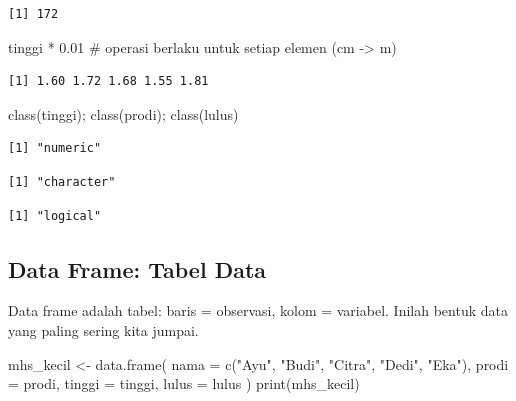 \documentclass[
  indonesian,
  letterpaper,
]{book}
\newenvironment{Shaded}{\begin{snugshade}}{\end{snugshade}}
\newcommand{\AttributeTok}[1]{\textcolor[rgb]{0.40,0.45,0.13}{#1}}
\newcommand{\CommentTok}[1]{\textcolor[rgb]{0.37,0.37,0.37}{#1}}
\newcommand{\FloatTok}[1]{\textcolor[rgb]{0.68,0.00,0.00}{#1}}
\newcommand{\FunctionTok}[1]{\textcolor[rgb]{0.28,0.35,0.67}{#1}}
\newcommand{\NormalTok}[1]{\textcolor[rgb]{0.00,0.23,0.31}{#1}}
\newcommand{\OtherTok}[1]{\textcolor[rgb]{0.00,0.23,0.31}{#1}}
\newcommand{\SpecialCharTok}[1]{\textcolor[rgb]{0.37,0.37,0.37}{#1}}
\newcommand{\StringTok}[1]{\textcolor[rgb]{0.13,0.47,0.30}{#1}}
\begin{document}
\begin{verbatim}
[1] 172
\end{verbatim}

\begin{Shaded}
\begin{Highlighting}[]
\NormalTok{tinggi }\SpecialCharTok{*} \FloatTok{0.01} \CommentTok{\# operasi berlaku untuk setiap elemen (cm {-}\textgreater{} m)}
\end{Highlighting}
\end{Shaded}

\begin{verbatim}
[1] 1.60 1.72 1.68 1.55 1.81
\end{verbatim}

\begin{Shaded}
\begin{Highlighting}[]
\FunctionTok{class}\NormalTok{(tinggi); }\FunctionTok{class}\NormalTok{(prodi); }\FunctionTok{class}\NormalTok{(lulus)}
\end{Highlighting}
\end{Shaded}

\begin{verbatim}
[1] "numeric"
\end{verbatim}

\begin{verbatim}
[1] "character"
\end{verbatim}

\begin{verbatim}
[1] "logical"
\end{verbatim}

\subsection{Data Frame: Tabel Data}\label{data-frame-tabel-data}

Data frame adalah tabel: baris = observasi, kolom = variabel. Inilah
bentuk data yang paling sering kita jumpai.

\begin{Shaded}
\begin{Highlighting}[]
\NormalTok{mhs\_kecil }\OtherTok{\textless{}{-}} \FunctionTok{data.frame}\NormalTok{(}
\AttributeTok{nama =} \FunctionTok{c}\NormalTok{(}\StringTok{"Ayu"}\NormalTok{, }\StringTok{"Budi"}\NormalTok{, }\StringTok{"Citra"}\NormalTok{, }\StringTok{"Dedi"}\NormalTok{, }\StringTok{"Eka"}\NormalTok{),}
\AttributeTok{prodi =}\NormalTok{ prodi,}
\AttributeTok{tinggi =}\NormalTok{ tinggi,}
\AttributeTok{lulus =}\NormalTok{ lulus}
\NormalTok{)}
\FunctionTok{print}\NormalTok{(mhs\_kecil)}
\end{Highlighting}
\end{Shaded}
\end{document}
